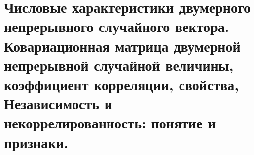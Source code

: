 \documentclass[polytech/stats/exam-2023/stats-exam-2023.tex]{subfiles}
\begin{document}
\section{Числовые характеристики двумерного непрерывного случайного вектора. Ковариационная матрица двумерной непрерывной случайной величины, коэффициент корреляции, свойства, Независимость и некоррелированность: понятие и признаки.}
\end{document}
